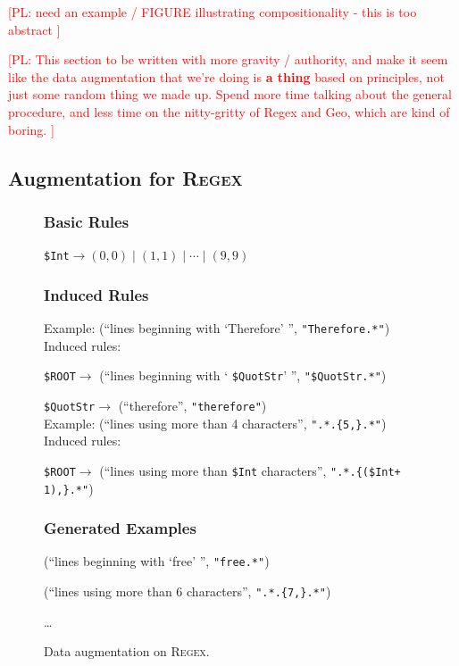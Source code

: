 \documentclass[11pt,letterpaper]{article}
\newcommand{\regex}{\textsc{Regex}\xspace}
\newcommand{\catroot}{\texttt{\$ROOT}\xspace}
\newcommand{\catquotstr}{\texttt{\$QuotStr}\xspace}
\newcommand{\catint}{\texttt{\$Int}\xspace}
\newcommand\pl[1]{\textcolor{red}{[PL: #1]}}
\begin{document}

\pl{need an example / FIGURE illustrating compositionality - this is too abstract
}

\pl{This section to be written with more gravity / authority,
  and make it seem like the data augmentation that we're doing is \textbf{a thing}
  based on principles, not just some random thing we made up.
  Spend more time talking about the general procedure,
  and less time on the nitty-gritty of Regex and Geo,
  which are kind of boring.
}


\subsection{Augmentation for \regex}
\begin{figure}[t] 
\small
\begin{framed}
\footnotesize
\subsubsection*{Basic Rules}
\catint $\to (0, 0) \mid (1, 1) \mid \dotsb \mid (9, 9)$

\subsubsection*{Induced Rules}
Example: (``lines beginning with `Therefore' '', \texttt{"Therefore.*"})\\
Induced rules:

\quad \catroot $\to$ (``lines beginning with ` \catquotstr ' '', \texttt{"}\catquotstr\texttt{.*"})

\quad \catquotstr $\to$ (``therefore'', \texttt{"therefore"}) \\

Example: (``lines using more than 4 characters'', \texttt{".*.\{5,\}.*"})\\
Induced rules:

\quad \catroot $\to$ (``lines using more than \catint characters'', \texttt{".*.\{(\catint + 1),\}.*"})

\subsubsection*{Generated Examples} 
(``lines beginning with `free' '', \texttt{"free.*"})

(``lines using more than 6 characters'', \texttt{".*.\{7,\}.*"})

\dots
\end{framed}
\caption{Data augmentation on \regex.}
\label{fig:augment-regex}
\end{figure}
\end{document}
